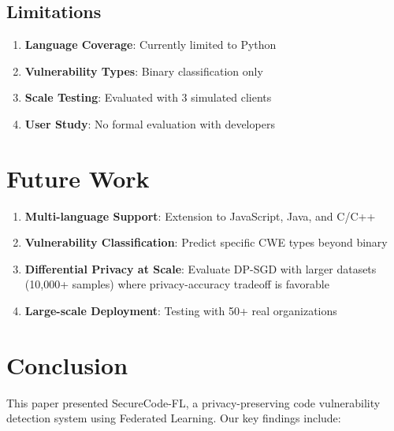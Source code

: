 \documentclass[conference]{IEEEtran}
\begin{document}
\subsection{Limitations}

\begin{enumerate}
    \item \textbf{Language Coverage}: Currently limited to Python
    \item \textbf{Vulnerability Types}: Binary classification only
    \item \textbf{Scale Testing}: Evaluated with 3 simulated clients
    \item \textbf{User Study}: No formal evaluation with developers
\end{enumerate}

\section{Future Work}

\begin{enumerate}
    \item \textbf{Multi-language Support}: Extension to JavaScript, Java, and C/C++
    \item \textbf{Vulnerability Classification}: Predict specific CWE types beyond binary
    \item \textbf{Differential Privacy at Scale}: Evaluate DP-SGD with larger datasets (10,000+ samples) where privacy-accuracy tradeoff is favorable
    \item \textbf{Large-scale Deployment}: Testing with 50+ real organizations
\end{enumerate}

\section{Conclusion}

This paper presented SecureCode-FL, a privacy-preserving code vulnerability detection system using Federated Learning. Our key findings include:
\end{document}
